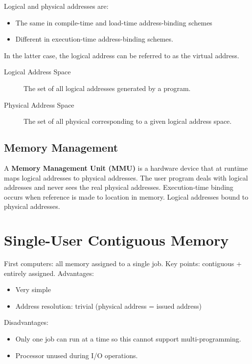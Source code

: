 \documentclass[11pt]{article}
\begin{document}
Logical and physical addresses are:
\begin{itemize}
\item The same in compile-time and load-time address-binding schemes
\item Different in execution-time address-binding schemes.
\end{itemize}
In the latter case, the logical address can be referred to as the virtual address.
\begin{description}
\item[{Logical Address Space}] The set of all logical addresses generated by a program.
\item[{Physical Address Space}] The set of all physical corresponding to a given logical address space.
\end{description}

\subsection{Memory Management}
\label{sec:org6493778}
A \textbf{Memory Management Unit (MMU)} is a hardware device that at runtime maps logical addresses to physical addresses.
The user program deals with logical addresses and never sees the real physical addresses.
Execution-time binding occurs when reference is made to location in memory.
Logical addresses bound to physical addresses.

\section{Single-User Contiguous Memory}
\label{sec:org483836c}
First computers: all memory assigned to a single job.
Key points: contiguous + entirely assigned.
Advantages:
\begin{itemize}
\item Very simple
\item Address resolution: trivial (physical address = issued address)
\end{itemize}
Disadvantages:
\begin{itemize}
\item Only one job can run at a time so this cannot support multi-programming.
\item Processor unused during I/O operations.
\end{itemize}
\end{document}
